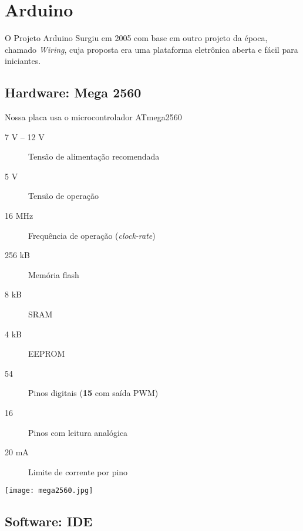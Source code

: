 \section{Arduino}


\begin{frame}{O Projeto Arduino}
  Surgiu em 2005 com base em outro projeto da época, chamado \textit{Wiring}, cuja proposta era uma plataforma eletrônica aberta e fácil para iniciantes.

\end{frame}


\subsection{Hardware: Mega 2560}


\begin{frame}{\insertsubsection}
  Nossa placa usa o microcontrolador \textcolor{CustomTeal}{ATmega2560}
  \begin{description}
    \item[7 V -- 12 V] Tensão de alimentação recomendada
    \item[5 V] Tensão de operação
    \item[16 MHz] Frequência de operação (\textit{clock-rate})
    \item[256 kB] Memória flash
    \item[8 kB] SRAM
    \item[4 kB] EEPROM
    \item[54] Pinos digitais (\textbf{\textcolor{CustomOrange}{15}} com saída PWM)
    \item[16] Pinos com leitura analógica
    \item[20 mA] Limite de corrente por pino
  \end{description}
\end{frame}


{ 
\begin{frame}{\insertsubsection}
  \texttt{[image: mega2560.jpg]}
\end{frame}
}


\subsection{Software: IDE}


